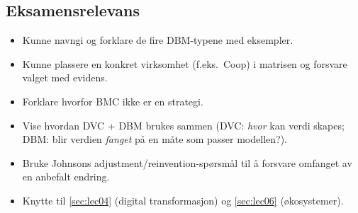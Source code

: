 \subsection{Eksamensrelevans}
\begin{itemize}
  \item Kunne navngi og forklare de fire DBM-typene med eksempler.
  \item Kunne plassere en konkret virksomhet (f.eks.\ Coop) i matrisen og
    forsvare valget med evidens.
  \item Forklare hvorfor BMC ikke er en strategi.
  \item Vise hvordan DVC + DBM brukes sammen (DVC: \emph{hvor} kan verdi
    skapes; DBM: blir verdien \emph{fanget} på en måte som passer modellen?).
  \item Bruke Johnsons adjustment/reinvention-spørsmål til å forsvare
    omfanget av en anbefalt endring.
  \item Knytte til \autoref{sec:lec04} (digital transformasjon) og
    \autoref{sec:lec06} (økosystemer).
\end{itemize}
